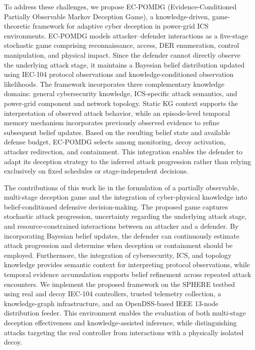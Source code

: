 \documentclass[10pt,conference]{IEEEtran}
\begin{document}
To address these challenges, we propose EC-POMDG (Evidence-Conditioned Partially Observable Markov Deception Game), a knowledge-driven, game-theoretic framework for adaptive cyber deception in power-grid ICS environments. EC-POMDG models attacker--defender interactions as a five-stage stochastic game comprising reconnaissance, access, DER enumeration, control manipulation, and physical impact. Since the defender cannot directly observe the underlying attack stage, it maintains a Bayesian belief distribution updated using IEC-104 protocol observations and knowledge-conditioned observation likelihoods. The framework incorporates three complementary knowledge domains: general cybersecurity knowledge, ICS-specific attack semantics, and power-grid component and network topology. Static KG context supports the interpretation of observed attack behavior, while an episode-level temporal memory mechanism incorporates previously observed evidence to refine subsequent belief updates. Based on the resulting belief state and available defense budget, EC-POMDG selects among monitoring, decoy activation, attacker redirection, and containment. This integration enables the defender to adapt its deception strategy to the inferred attack progression rather than relying exclusively on fixed schedules or stage-independent decisions.

The contributions of this work lie in the formulation of a partially observable, multi-stage deception game and the integration of cyber-physical knowledge into belief-conditioned defensive decision-making. The proposed game captures stochastic attack progression, uncertainty regarding the underlying attack stage, and resource-constrained interactions between an attacker and a defender. By incorporating Bayesian belief updates, the defender can continuously estimate attack progression and determine when deception or containment should be employed. Furthermore, the integration of cybersecurity, ICS, and topology knowledge provides semantic context for interpreting protocol observations, while temporal evidence accumulation supports belief refinement across repeated attack encounters. We implement the proposed framework on the SPHERE testbed using real and decoy IEC-104 controllers, trusted telemetry collection, a knowledge-graph infrastructure, and an OpenDSS-based IEEE 13-node distribution feeder. This environment enables the evaluation of both multi-stage deception effectiveness and knowledge-assisted inference, while distinguishing attacks targeting the real controller from interactions with a physically isolated decoy.
\end{document}
